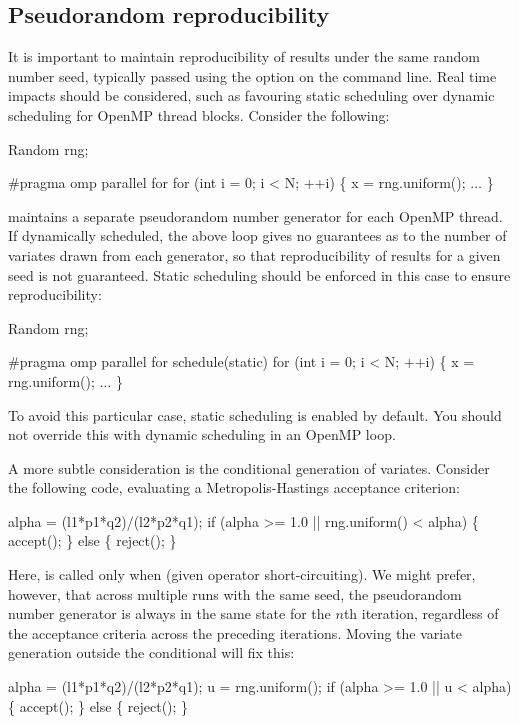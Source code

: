 \subsection{Pseudorandom reproducibility\label{Pseudorandom_reproducibility}}

It is important to maintain reproducibility of results under the same random
number seed, typically passed using the
 option on the command line. Real time impacts should be
considered, such as favouring static scheduling over
dynamic scheduling for OpenMP thread
blocks. Consider the following:
\begin{cppcode}
Random rng;

#pragma omp parallel for
for (int i = 0; i < N; ++i) \{
  x = rng.uniform();
  \(\ldots\)
\}
\end{cppcode}

 maintains a separate pseudorandom number
generator for each OpenMP thread. If
dynamically scheduled, the above loop gives no guarantees as to the number of
variates drawn from each generator, so that reproducibility of results for a
given seed is not guaranteed. Static scheduling should be enforced in this
case to ensure reproducibility:
\begin{cppcode}
Random rng;

#pragma omp parallel for schedule(static)
for (int i = 0; i < N; ++i) \{
  x = rng.uniform();
  \(\ldots\)
\}
\end{cppcode}

\begin{tip}
To avoid this particular case, static scheduling is enabled by default. You
should not override this with dynamic scheduling in an OpenMP loop.
\end{tip}

A more subtle consideration is the conditional generation of
variates. Consider the following code, evaluating a
Metropolis-Hastings acceptance criterion:
\begin{cppcode}
alpha = (l1*p1*q2)/(l2*p2*q1);
if (alpha >= 1.0 || rng.uniform() < alpha) \{
  accept();
\} else \{
  reject();
\}
\end{cppcode}
Here,  is called only when  (given
operator short-circuiting). We might prefer, however, that across multiple
runs with the same seed, the pseudorandom number generator is always in the
same state for the $n$th iteration, regardless of the acceptance criteria
across the preceding iterations. Moving the variate generation outside the
conditional will fix this:
\begin{cppcode}
alpha = (l1*p1*q2)/(l2*p2*q1);
u = rng.uniform();
if (alpha >= 1.0 || u < alpha) \{
  accept();
\} else \{
  reject();
\}
\end{cppcode}

